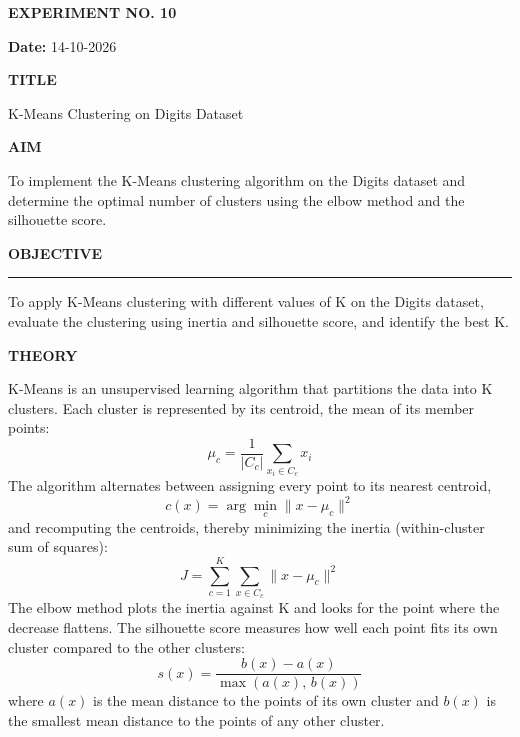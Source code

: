 \documentclass[11pt,twoside]{article}
\newcommand{\expheading}[1]{{\fontsize{14}{17}\selectfont\textbf{#1}\par}}
\newcommand{\fullrule}{\noindent\rule{\textwidth}{0.6pt}\par}
\begin{document}
{\makeatletter\let\vspace\@gobble\makeatother\setlength{\parskip}{0pt}\setlength{\abovedisplayskip}{0pt}\setlength{\belowdisplayskip}{0pt}
\begin{center}
\expheading{EXPERIMENT NO. 10}
\end{center}
\vspace{2pt}

\noindent\textbf{Date:} 14-10-2026\par
\vspace{6pt}

\expheading{TITLE}
\vspace{4pt}
\noindent K-Means Clustering on Digits Dataset\par
\vspace{4pt}

\expheading{AIM}
\vspace{4pt}
\noindent To implement the K-Means clustering algorithm on the Digits dataset and determine the optimal number of clusters using the elbow method and the silhouette score. \par
\vspace{4pt}

\expheading{OBJECTIVE}
\vspace{2pt}
\fullrule
\vspace{4pt}
\noindent To apply K-Means clustering with different values of K on the Digits dataset, evaluate the clustering using inertia and silhouette score, and identify the best K. \par
\vspace{4pt}

\expheading{THEORY}
\vspace{4pt}
K-Means is an unsupervised learning algorithm that partitions the data into K clusters. Each cluster is represented by its centroid, the mean of its member points:
\[\mu_c=\frac{1}{|C_c|}\sum_{x_i\in C_c}x_i\]
The algorithm alternates between assigning every point to its nearest centroid,
\[c(x)=\arg\min_c \lVert x-\mu_c\rVert^2\]
and recomputing the centroids, thereby minimizing the inertia (within-cluster sum of squares):
\[J=\sum_{c=1}^{K}\sum_{x\in C_c}\lVert x-\mu_c\rVert^2\]
The elbow method plots the inertia against K and looks for the point where the decrease flattens. The silhouette score measures how well each point fits its own cluster compared to the other clusters:
\[s(x)=\frac{b(x)-a(x)}{\max(a(x),\,b(x))}\]
where $a(x)$ is the mean distance to the points of its own cluster and $b(x)$ is the smallest mean distance to the points of any other cluster.
\vspace{4pt}

}
\end{document}
